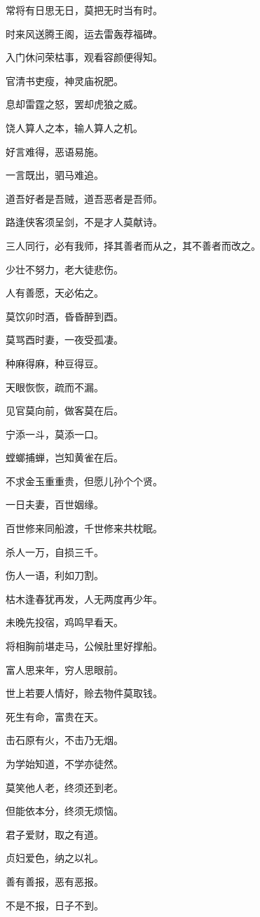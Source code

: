 \documentclass[12pt,oneside]{book}
\begin{document}
常将有日思无日，莫把无时当有时。

时来风送腾王阁，运去雷轰荐福碑。

入门休问荣枯事，观看容颜便得知。

官清书吏瘦，神灵庙祝肥。

息却雷霆之怒，罢却虎狼之威。

饶人算人之本，输人算人之机。

好言难得，恶语易施。

一言既出，驷马难追。

道吾好者是吾贼，道吾恶者是吾师。

路逢侠客须呈剑，不是才人莫献诗。

三人同行，必有我师，择其善者而从之，其不善者而改之。

少壮不努力，老大徒悲伤。

人有善愿，天必佑之。

莫饮卯时酒，昏昏醉到酉。

莫骂酉时妻，一夜受孤凄。

种麻得麻，种豆得豆。

天眼恢恢，疏而不漏。

见官莫向前，做客莫在后。

宁添一斗，莫添一口。

螳螂捕蝉，岂知黄雀在后。

不求金玉重重贵，但愿儿孙个个贤。

一日夫妻，百世姻缘。

百世修来同船渡，千世修来共枕眠。

杀人一万，自损三千。

伤人一语，利如刀割。

枯木逢春犹再发，人无两度再少年。

未晚先投宿，鸡鸣早看天。

将相胸前堪走马，公候肚里好撑船。

富人思来年，穷人思眼前。

世上若要人情好，赊去物件莫取钱。

死生有命，富贵在天。

击石原有火，不击乃无烟。

为学始知道，不学亦徒然。

莫笑他人老，终须还到老。

但能依本分，终须无烦恼。

君子爱财，取之有道。

贞妇爱色，纳之以礼。

善有善报，恶有恶报。

不是不报，日子不到。
\end{document}
